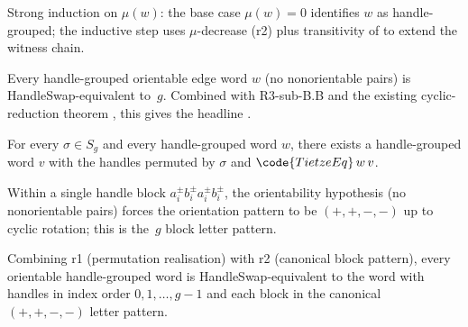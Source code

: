 \begin{lemma}
\label{lem:r3subB-B-r3}
Strong induction on \(\mu(w)\): the base case \(\mu(w)=0\)
identifies \(w\) as handle-grouped; the inductive step uses
\(\mu\)-decrease (r2) plus transitivity of  to
extend the witness chain.
\leanok
\end{lemma}

\begin{lemma}
\label{lem:r3subB-standardisation}
Every handle-grouped orientable edge word \(w\) (no nonorientable
pairs) is HandleSwap-equivalent to \(\,g\).  Combined
with R3-sub-B.B and the existing cyclic-reduction theorem
, this gives the headline
.
\leanok
\end{lemma}

\begin{lemma}
\label{lem:r3subB-C-r1}
For every \(\sigma\in S_{g}\) and every handle-grouped word \(w\),
there exists a handle-grouped word \(v\) with the handles permuted
by \(\sigma\) and \(\code{TietzeEq}\,w\,v\).
\leanok
\end{lemma}

\begin{lemma}
\label{lem:r3subB-C-r2}
Within a single handle block \(a_{i}^{\pm}b_{i}^{\pm}a_{i}^{\pm}b_{i}^{\pm}\),
the orientability hypothesis (no nonorientable pairs) forces the
orientation pattern to be \((+,+,-,-)\) up to cyclic rotation; this
is the \(\,g\) block letter pattern.
\leanok
\end{lemma}

\begin{lemma}
\label{lem:r3subB-C-r3}
Combining r1 (permutation realisation) with r2 (canonical block
pattern), every orientable handle-grouped word is HandleSwap-equivalent
to the word with handles in index order \(0,1,\dots,g-1\) and
each block in the canonical \((+,+,-,-)\) letter pattern.
\leanok
\end{lemma}

